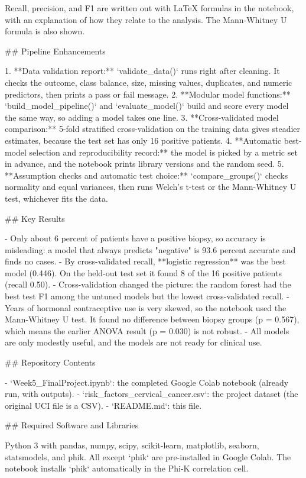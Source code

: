 Recall, precision, and F1 are written out with LaTeX formulas in the notebook, with an explanation of how they relate to the analysis. The Mann-Whitney U formula is also shown.

## Pipeline Enhancements

1. **Data validation report:** `validate_data()` runs right after cleaning. It checks the outcome, class balance, size, missing values, duplicates, and numeric predictors, then prints a pass or fail message.
2. **Modular model functions:** `build_model_pipeline()` and `evaluate_model()` build and score every model the same way, so adding a model takes one line.
3. **Cross-validated model comparison:** 5-fold stratified cross-validation on the training data gives steadier estimates, because the test set has only 16 positive patients.
4. **Automatic best-model selection and reproducibility record:** the model is picked by a metric set in advance, and the notebook prints library versions and the random seed.
5. **Assumption checks and automatic test choice:** `compare_groups()` checks normality and equal variances, then runs Welch's t-test or the Mann-Whitney U test, whichever fits the data.

## Key Results

- Only about 6 percent of patients have a positive biopsy, so accuracy is misleading: a model that always predicts "negative" is 93.6 percent accurate and finds no cases.
- By cross-validated recall, **logistic regression** was the best model (0.446). On the held-out test set it found 8 of the 16 positive patients (recall 0.50).
- Cross-validation changed the picture: the random forest had the best test F1 among the untuned models but the lowest cross-validated recall.
- Years of hormonal contraceptive use is very skewed, so the notebook used the Mann-Whitney U test. It found no difference between biopsy groups (p = 0.567), which means the earlier ANOVA result (p = 0.030) is not robust.
- All models are only modestly useful, and the models are not ready for clinical use.

## Repository Contents

- `Week5_FinalProject.ipynb`: the completed Google Colab notebook (already run, with outputs).
- `risk_factors_cervical_cancer.csv`: the project dataset (the original UCI file is a CSV).
- `README.md`: this file.

## Required Software and Libraries

Python 3 with pandas, numpy, scipy, scikit-learn, matplotlib, seaborn, statsmodels, and phik. All except `phik` are pre-installed in Google Colab. The notebook installs `phik` automatically in the Phi-K correlation cell.

